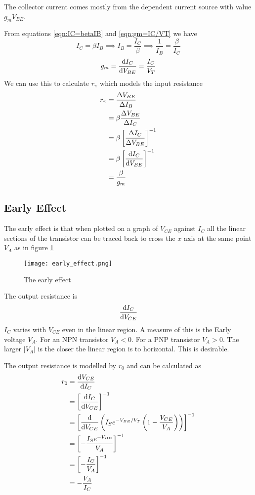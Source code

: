 \documentclass{article}
\begin{document}
    The collector current comes mostly from the dependent current source with value \(g_mV_{BE}\).
    
    From equations \ref{eqn:IC=betaIB} and \ref{eqn:gm=IC/VT} we have
    \[I_C=\beta I_B\implies I_B = \frac{I_C}{\beta}\implies\frac{1}{I_B}=\frac{\beta}{I_C}\]
    \[g_m = \dv{I_C}{V_{BE}} = \frac{I_C}{V_T}\]
    We can use this to calculate \(r_\pi\) which models the input resistance
    \begin{align*}
        r_\pi &= \frac{\Delta V_{BE}}{\Delta I_B}\\
        &= \beta\frac{\Delta V_{BE}}{\Delta I_C}\\
        &= \beta\left[\frac{\Delta I_C}{\Delta V_{BE}}\right]^{-1}\\
        &= \beta\left[\dv{I_C}{V_{BE}}\right]^{-1}\\
        &= \frac{\beta}{g_m}
    \end{align*}
    
    \subsection{Early Effect}\label{early effect}
    The early effect is that when plotted on a graph of \(V_{CE}\) against \(I_C\) all the linear sections of the transistor can be traced back to cross the \(x\) axis at the same point \(V_A\) as in figure \ref{fig:early effect}
    \begin{figure}[ht]
        \centering
        \texttt{[image: early\_effect.png]}
        \caption{The early effect}
        \label{fig:early effect}
    \end{figure}
    The output resistance is 
    \[\dv{I_C}{V_{CE}}\]
    \(I_C\) varies with \(V_{CE}\) even in the linear region. A measure of this is the Early voltage \(V_A\). For an NPN transistor \(V_A<0\). For a PNP transistor \(V_A>0\). The larger \(|V_A|\) is the closer the linear region is to horizontal. This is desirable.
    
    The output resistance is modelled by \(r_0\) and can be calculated as
    \begin{align*}
        r_0 &= \dv{V_{CE}}{I_C}\\
        &= \left[\dv{I_C}{V_{CE}}\right]^{-1}\\
        &= \left[\dv{V_{CE}}\left(I_Se^{-V_{BE}/V_T}\left(1-\frac{V_{CE}}{V_A}\right)\right)\right]^{-1}\\
        &= \left[-\frac{I_Se^{-V_{BE}}}{V_A}\right]^{-1}\\
        &= \left[-\frac{I_C}{V_A}\right]^{-1}\\
        &= -\frac{V_A}{I_C}
    \end{align*}
    
\end{document}
